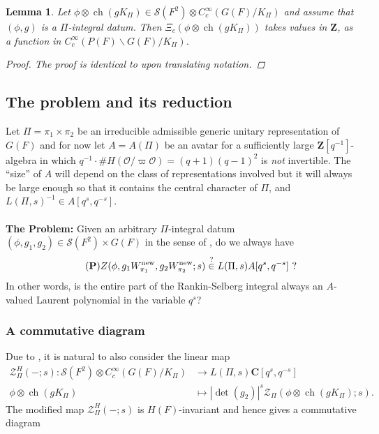 \documentclass{amsart}
\theoremstyle{plain}
\newtheorem{lem}[thm]{Lemma}
\theoremstyle{plain}
\theoremstyle{remark}
\DeclareMathOperator{\ch}{ch}
\begin{document}
\begin{lem}\label{lem integrality lemma}
    Let $\phi\otimes \ch(g K_\Pi)\in \mathcal{S}(F^2)\otimes C_c^\infty(G(F)/K_\Pi)$ and assume that $(\phi,g)$ is a $\Pi$-integral datum. Then 
    $\Xi_c(\phi\otimes \ch(gK_\Pi))$ takes values in $\mathbf{Z}$, as a function in 
 $C_c^\infty(P(F)\backslash G(F)/K_\Pi)$.
    \begin{proof}
        The proof is identical to \cite[Proposition $3.2$]{groutides2024rankinselbergintegralstructureseuler} upon translating notation.
    \end{proof}
\end{lem}
\subsection{The problem and its reduction}\label{sec reduction}  Let $\Pi=\pi_1\times \pi_2$ be an irreducible admissible generic unitary representation of $G(F)$ and for now let $A=A(\Pi)$ be an avatar for a sufficiently large $\mathbf{Z}[q^{-1}]$-algebra in which $q^{-1}\cdot\#H(\mathcal{O}/\varpi\mathcal{O})=(q+1)(q-1)^2$ is \textit{not} invertible. The ``size'' of $A$ will depend on the class of representations involved but it will always be large enough so that it contains the central character of $\Pi$, and $L(\Pi,s)^{-1}\in A[q^s,q^{-s}]$.\\
\\
\textbf{The Problem:} Given an arbitrary $\Pi$-integral datum $(\phi,g_1,g_2)\in \mathcal{S}(F^2)\times G(F)$ in the sense of , do we always have
\begin{align}\label{eq: Problem}\tag{\textbf{P}}
Z(\phi,g_1W_{\pi_1}^\mathrm{new}, g_2W_{\pi_2}^\mathrm{new};s)\overset{?}{\in} L(\Pi,s)A[q^s,q^{-s}]\ ?
\end{align}
In other words, is the entire part of the Rankin-Selberg integral always an $A$-valued Laurent polynomial in the variable $q^{ s}$?
\subsubsection{A commutative diagram}
\noindent Due to , it is natural to also consider the linear map 
\begin{align*}\mathcal{Z}^H_\Pi(-;s):\mathcal{S}(F^2)\otimes C_c^\infty(G(F)/K_\Pi)&\longrightarrow L(\Pi,s)\mathbf{C}[q^s,q^{-s}]\\
\phi\otimes \ch(gK_\Pi)&\mapsto |\det(g_2)|^s \mathcal{Z}_\Pi(\phi\otimes \ch(gK_\Pi);s).\end{align*}
The modified map $\mathcal{Z}_\Pi^H(-;s)$ is $H(F)$-invariant and hence  gives a commutative diagram
\end{document}
